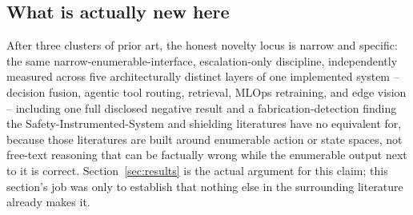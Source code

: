 \subsection{What is actually new here}

After three clusters of prior art, the honest novelty locus is narrow and specific: the same
narrow-enumerable-interface, escalation-only discipline, independently measured across five
architecturally distinct layers of one implemented system -- decision fusion, agentic tool
routing, retrieval, MLOps retraining, and edge vision -- including one full disclosed negative
result and a fabrication-detection finding the Safety-Instrumented-System and shielding
literatures have no equivalent for, because those literatures are built around enumerable
action or state spaces, not free-text reasoning that can be factually wrong while the enumerable
output next to it is correct. Section~\ref{sec:results} is the actual argument for this claim; this
section's job was only to establish that nothing else in the surrounding literature already makes
it.
